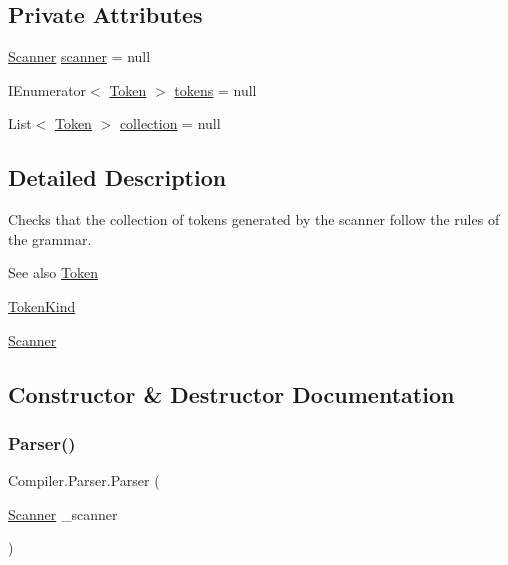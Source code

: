 \subsection*{Private Attributes}
\begin{DoxyCompactItemize}
\item 
\mbox{\hyperlink{class_compiler_1_1_scanner}{Scanner}} \mbox{\hyperlink{class_compiler_1_1_parser_a022d273a476d1ce6198f601275fa9a15}{scanner}} = null
\item 
I\+Enumerator$<$ \mbox{\hyperlink{class_compiler_1_1_token}{Token}} $>$ \mbox{\hyperlink{class_compiler_1_1_parser_a4db075175c853a197c7b8db7d787a0a5}{tokens}} = null
\item 
List$<$ \mbox{\hyperlink{class_compiler_1_1_token}{Token}} $>$ \mbox{\hyperlink{class_compiler_1_1_parser_ac30c9381b172d482cc5bb1356c5a901b}{collection}} = null
\end{DoxyCompactItemize}


\subsection{Detailed Description}
Checks that the collection of tokens generated by the scanner follow the rules of the grammar. \begin{DoxySeeAlso}{See also}
\mbox{\hyperlink{class_compiler_1_1_token}{Token}} 

\mbox{\hyperlink{namespace_compiler_a57929962f25004759596fc3f13cf563c}{Token\+Kind}} 

\mbox{\hyperlink{class_compiler_1_1_scanner}{Scanner}} 
\end{DoxySeeAlso}


\subsection{Constructor \& Destructor Documentation}
\mbox{\label{class_compiler_1_1_parser_a450e11452db3f91ff866fc1e36ebc79d}} 
\subsubsection{\texorpdfstring{Parser()}{Parser()}}
{\footnotesize\ttfamily Compiler.\+Parser.\+Parser (\begin{DoxyParamCaption}\item[{\mbox{\hyperlink{class_compiler_1_1_scanner}{Scanner}}}]{\+\_\+scanner }\end{DoxyParamCaption})}

